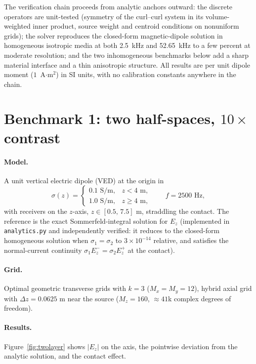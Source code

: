 \documentclass[11pt]{article}
\begin{document}
The verification chain proceeds from analytic anchors outward: the discrete
operators are unit-tested (symmetry of the curl--curl system in its
volume-weighted inner product, source weight and centroid conditions on
nonuniform grids); the solver reproduces the closed-form magnetic-dipole
solution in homogeneous isotropic media at both 2.5~kHz and 52.65~kHz to a
few percent at moderate resolution; and the two inhomogeneous benchmarks
below add a sharp material interface and a thin anisotropic structure. All
results are per unit dipole moment ($1$~A$\cdot$m$^2$) in SI units, with no
calibration constants anywhere in the chain.

\section{Benchmark 1: two half-spaces, $10\times$ contrast}

\paragraph{Model.} A unit vertical electric dipole (VED) at the origin in
\[
\sigma(z) = \begin{cases} 0.1 \text{ S/m}, & z < 4\text{ m},\\
1.0 \text{ S/m}, & z \ge 4 \text{ m},\end{cases}
\qquad f = 2500 \text{ Hz},
\]
with receivers on the $z$-axis, $z\in[0.5,\,7.5]$ m, straddling the contact.
The reference is the exact Sommerfeld-integral solution for $E_z$
(implemented in \texttt{analytics.py} and independently verified: it reduces
to the closed-form homogeneous solution when $\sigma_1=\sigma_2$ to
$3\times10^{-14}$ relative, and satisfies the normal-current continuity
$\sigma_1 E_z^- = \sigma_2 E_z^+$ at the contact).

\paragraph{Grid.} Optimal geometric transverse grids with $k=3$
($M_x=M_y=12$), hybrid axial grid with $\Delta z = 0.0625$ m near the source
($M_z=160$, $\approx 41$k complex degrees of freedom).

\paragraph{Results.} Figure~\ref{fig:twolayer} shows $|E_z|$ on the axis, the
pointwise deviation from the analytic solution, and the contact effect.
\end{document}
